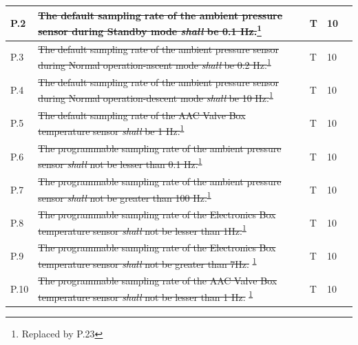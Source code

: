 \documentclass[a4paper,12pt,twoside]{article}
\begin{document}
\begin{longtable}[]{|m{}| m{} |m{} |m{}|m{}|}
P.2  & \st{The default sampling rate of the ambient pressure sensor during Standby mode \textit{shall} be 0.1 Hz.}\footnote{Replaced by P.23\label{replaceSoftVeri}}                                                                       &      T        & 10            &        \\ \hline
P.3  & \st{The default sampling rate of the ambient pressure sensor during Normal operation-ascent mode \textit{shall} be 0.2 Hz.}\textsuperscript{\ref{replaceSoftVeri}}                                                           &      T        & 10            &        \\ \hline
P.4  & \st{The default sampling rate of the ambient pressure sensor during Normal operation-descent mode \textit{shall} be 10 Hz.}\textsuperscript{\ref{replaceSoftVeri}}                                                           &       T       & 10            &        \\ \hline
P.5  & \st{The default sampling rate of the AAC Valve Box temperature sensor \textit{shall} be 1 Hz.}\textsuperscript{\ref{replaceSoftVeri}}                                                                                        &      T        & 10            &        \\ \hline
P.6  &\st{ The programmable sampling rate of the ambient pressure sensor \textit{shall} not be lesser than 0.1 Hz.}\textsuperscript{\ref{replaceSoftVeri}}                                                                          &      T        & 10            &        \\ \hline
P.7  & \st{The programmable sampling rate of the ambient pressure sensor \textit{shall} not be greater than 100 Hz.}\textsuperscript{\ref{replaceSoftVeri}}                                                                         &       T       & 10            &        \\ \hline
P.8  & \st{The programmable sampling rate of the Electronics Box temperature sensor \textit{shall} not be lesser than 1Hz.}\textsuperscript{\ref{replaceSoftVeri}}                                                                          &       T       & 10            &        \\ \hline
P.9  & \st{The programmable sampling rate of the Electronics Box temperature sensor \textit{shall} not be greater than 7Hz. }\textsuperscript{\ref{replaceSoftVeri}}                                                                        &        T      & 10            &        \\ \hline
P.10 & \st{The programmable sampling rate of the AAC Valve Box temperature sensor \textit{shall} not be lesser than 1 Hz. }\textsuperscript{\ref{replaceSoftVeri}}                                                                  &        T      & 10            &        \\ \hline

\end{longtable}
\end{document}
